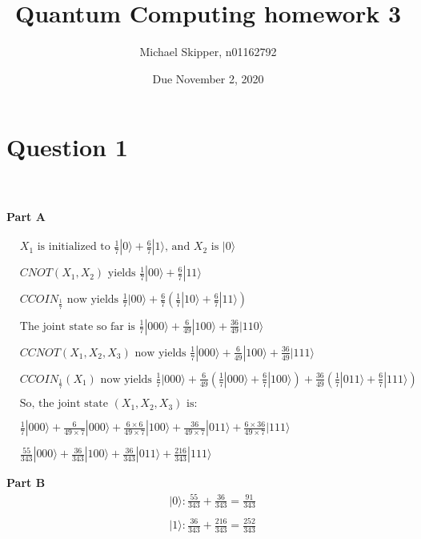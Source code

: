 \documentclass{article}
\title{Quantum Computing homework 3}
\author{Michael Skipper, n01162792}
\date{Due November 2, 2020}
\def\ket#1{|#1\rangle}
\begin{document}
\maketitle

\section{Question 1}
\\ \\
\textbf{Part A}

\begin{align*}
    & X_1 \text{ is initialized to } \frac{1}{7}\ket{0} + \frac{6}{7}\ket1 \text{, and } X_2 \text{ is } \ket{0}
    \\ \\ 
    & CNOT(X_1, X_2) \text{ yields } \frac{1}{7}\ket{00} + \frac{6}{7}\ket{11} 
    \\ \\ 
    & CCOIN_\frac{1}{7} \text{ now yields } \frac{1}{7}\ket{00} + \frac{6}{7}(\frac{1}{7}\ket{10} + \frac{6}{7}\ket{11})
    \\ \\ 
    & \text{The joint state so far is } \frac{1}{7}\ket{000} + \frac{6}{49}\ket{100} + \frac{36}{49}\ket{110}
    \\ \\ 
    & CCNOT(X_1, X_2, X_3) \text{ now yields } \frac{1}{7}\ket{000} + \frac{6}{49}\ket{100} + \frac{36}{49}\ket{111}
    \\ \\ 
    & CCOIN_\frac{1}{7}(X_1) \text{ now yields } \frac{1}{7}\ket{000} +
    \frac{6}{49}(\frac{1}{7}\ket{000} + \frac{6}{7}\ket{100}) + \frac{36}{49}(\frac{1}{7}\ket{011} + \frac{6}{7}\ket{111})
    \\ \\
    & \text{So, the joint state } (X_1, X_2, X_3) \text{ is: } 
    \\ \\
    &\frac{1}{7}\ket{000} + \frac{6}{49\times{7}}\ket{000} + \frac{6\times{6}}{49\times{7}}\ket{100}
    + \frac{36}{49\times{7}}\ket{011} + \frac{6\times{36}}{49\times{7}}\ket{111}
    \\ \\
    &\frac{55}{343}\ket{000} + \frac{36}{343}\ket{100} + \frac{36}{343}\ket{011} + \frac{216}{343}\ket{111}
    \\ \\
\end{align*}
\textbf{Part B}
\begin{align*}
    &\ket{0}: \frac{55}{343} + \frac{36}{343} = \frac{91}{343}
    \\ \\
    &\ket{1}: \frac{36}{343} + \frac{216}{343} = \frac{252}{343}
\end{align*}
\end{document}
